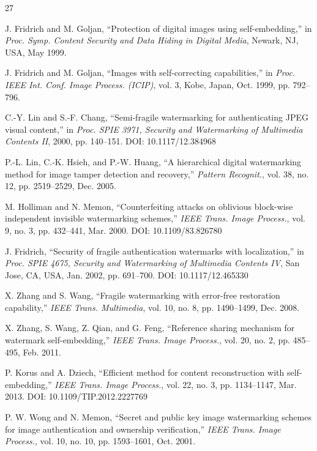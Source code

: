 \begin{thebibliography}{27}

 J. Fridrich and M. Goljan, ``Protection of digital images using self-embedding,'' in \emph{Proc. Symp. Content Security and Data Hiding in Digital Media}, Newark, NJ, USA, May 1999.

 J. Fridrich and M. Goljan, ``Images with self-correcting capabilities,'' in \emph{Proc. IEEE Int. Conf. Image Process. (ICIP)}, vol. 3, Kobe, Japan, Oct. 1999, pp. 792--796.

 C.-Y. Lin and S.-F. Chang, ``Semi-fragile watermarking for authenticating JPEG visual content,'' in \emph{Proc. SPIE 3971, Security and Watermarking of Multimedia Contents II}, 2000, pp. 140--151. DOI: 10.1117/12.384968

 P.-L. Lin, C.-K. Hsieh, and P.-W. Huang, ``A hierarchical digital watermarking method for image tamper detection and recovery,'' \emph{Pattern Recognit.}, vol. 38, no. 12, pp. 2519--2529, Dec. 2005.

 M. Holliman and N. Memon, ``Counterfeiting attacks on oblivious block-wise independent invisible watermarking schemes,'' \emph{IEEE Trans. Image Process.}, vol. 9, no. 3, pp. 432--441, Mar. 2000. DOI: 10.1109/83.826780

 J. Fridrich, ``Security of fragile authentication watermarks with localization,'' in \emph{Proc. SPIE 4675, Security and Watermarking of Multimedia Contents IV}, San Jose, CA, USA, Jan. 2002, pp. 691--700. DOI: 10.1117/12.465330

 X. Zhang and S. Wang, ``Fragile watermarking with error-free restoration capability,'' \emph{IEEE Trans. Multimedia}, vol. 10, no. 8, pp. 1490--1499, Dec. 2008.

 X. Zhang, S. Wang, Z. Qian, and G. Feng, ``Reference sharing mechanism for watermark self-embedding,'' \emph{IEEE Trans. Image Process.}, vol. 20, no. 2, pp. 485--495, Feb. 2011.

 P. Korus and A. Dziech, ``Efficient method for content reconstruction with self-embedding,'' \emph{IEEE Trans. Image Process.}, vol. 22, no. 3, pp. 1134--1147, Mar. 2013. DOI: 10.1109/TIP.2012.2227769

 P. W. Wong and N. Memon, ``Secret and public key image watermarking schemes for image authentication and ownership verification,'' \emph{IEEE Trans. Image Process.}, vol. 10, no. 10, pp. 1593--1601, Oct. 2001.


\end{thebibliography}
